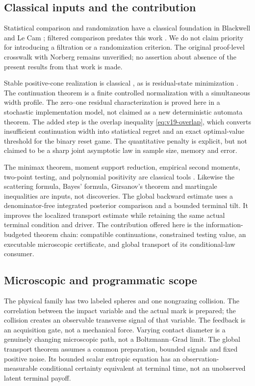 \subsection{Classical inputs and the contribution}
Statistical comparison and randomization have a classical foundation in
Blackwell and Le Cam \cite{Blackwell1953,LeCam1964,Torgersen1991}; filtered
comparison predates this work \cite{Norberg2002,Weisshaupt2006}. We do not
claim priority for introducing a filtration or a randomization criterion.
The original proof-level crosswalk with Norberg remains unverified; no
assertion about absence of the present results from that work is made.

Stable positive-cone realization is classical \cite{Fliess1975}, as is
residual-state minimization \cite{Nerode1958}. The continuation theorem is
a finite controlled normalization with a simultaneous width profile. The
zero--one residual characterization is proved here in a stochastic
implementation model, not claimed as a new deterministic automata theorem.
The added step is the overlap inequality \eqref{eq:v19-overlap}, which
converts insufficient continuation width into statistical regret and an
exact optimal-value threshold for the binary reset game. The quantitative
penalty is explicit, but not claimed to be a sharp joint asymptotic law in
sample size, memory and error.

The minimax theorem, moment support reduction, empirical second moments,
two-point testing, and polynomial positivity are classical tools
\cite{Sion1958,deKlerkLaurent2010,LaurentSlot2023,deKlerkVera2026}.
Likewise the scattering formula, Bayes' formula, Girsanov's theorem and
martingale inequalities are inputs, not discoveries. The global backward
estimate uses a denominator-free integrated posterior comparison and a
bounded terminal tilt. It improves the localized transport estimate while
retaining the same actual terminal condition and driver. The contribution
offered here is the information-budgeted theorem chain: compatible
continuations, constrained testing value, an executable microscopic
certificate, and global transport of its conditional-law consumer.

\subsection{Microscopic and programmatic scope}
The physical family has two labeled spheres and one nongrazing collision.
The correlation between the impact variable and the actual mark is
prepared; the collision creates an observable transverse signal of that
variable. The feedback is an acquisition gate, not a mechanical force.
Varying contact diameter is a genuinely changing microscopic path, not a
Boltzmann--Grad limit. The global transport theorem assumes a common
preparation, bounded signals and fixed positive noise. Its bounded scalar
entropic equation has an observation-measurable conditional certainty
equivalent at terminal time, not an unobserved latent terminal payoff.

